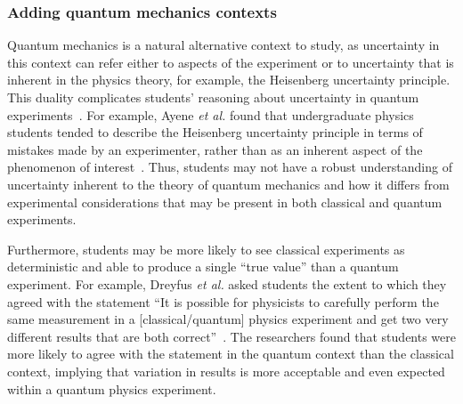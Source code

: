 \documentclass[english,aps,prstper,reprint,showpacs,longbibliography,superscriptaddress,nofootinbib]{revtex4-2}
\begin{document}
\subsubsection{Adding quantum mechanics contexts}

Quantum mechanics is a natural alternative context to study, as uncertainty in this context can refer either to aspects of the experiment or to uncertainty that is inherent in the physics theory, for example, the Heisenberg uncertainty principle. This duality complicates students' reasoning about uncertainty in quantum experiments~\cite{Ayene2011,KrijtenburgLewerissa2017,Singh2015,Zhu2012a,Bouchee2022,Johnston1998}. For example, Ayene \textit{et al.} found that undergraduate physics students tended to describe the Heisenberg uncertainty principle in terms of mistakes made by an experimenter, rather than as an inherent aspect of the phenomenon of interest~\cite{Ayene2011}. Thus, students may not have a robust understanding of uncertainty inherent to the theory of quantum mechanics and how it differs from experimental considerations that may be present in both classical and quantum experiments. 



Furthermore, students may be more likely to see classical experiments as deterministic and able to produce a single ``true value'' than a quantum experiment. For example, Dreyfus \textit{et al.} asked students the extent to which they agreed with the statement ``It is possible for physicists to carefully perform the same measurement in a [classical/quantum] physics experiment and get two very different results that are both correct''~\cite{Dreyfus2019}. The researchers found that students were more likely to agree with the statement in the quantum context than the classical context, implying that variation in results is more acceptable and even expected within a quantum physics experiment. 
\end{document}
